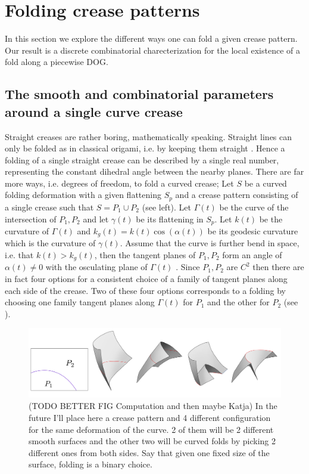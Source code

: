 \section{Folding crease patterns} \label{sec:folding}
In this section we explore the different ways one can fold a given crease pattern. Our result is a discrete combinatorial charecterization for the local existence of a fold along a piecewise DOG.

\subsection{The smooth and combinatorial parameters around a single curve crease}
Straight creases are rather boring, mathematically speaking. Straight lines can only be folded as in classical origami, i.e. by keeping them straight \cite{demaine_lens}. Hence a folding of a single straight crease can be described by a single real number, representing the constant dihedral angle between the nearby planes. There are far more ways, i.e. degrees of freedom, to fold a curved crease; Let $S$ be a curved folding deformation with a given flattening $S_p$ and a crease pattern consisting of a single crease such that $S = P_1 \cup P_2$ (see  left). Let $\Gamma(t)$ be the curve of the intersection of $P_1,P_2$ and let $\gamma(t)$ be its flattening in $S_p$. Let $k(t)$ be the curvature of $\Gamma(t)$ and $k_g(t) = k(t) \cos(\alpha(t))$ be its geodesic curvature which is the curvature of $\gamma(t)$. Assume that the curve is further bend in space, i.e. that $k(t) > k_g(t)$, then the tangent planes of $P_1,P_2$ form an angle of $\alpha(t) \neq 0$ with the osculating plane of $\Gamma(t)$ \cite{more_on_paper,duncan_folded}. Since $P_1,P_2$ are $C^2$ then there are in fact four options for a consistent choice of a family of tangent planes along each side of the crease. Two of these four options corresponds to a folding by choosing one family tangent planes along $\Gamma(t)$ for $P_1$ and the other for $P_2$ (see ).
\begin{figure} [h]
	\centering
	\includegraphics[width=\linewidth]{figures/curved_fold_through_curve.pdf}
	\caption{(TODO BETTER FIG Computation and then maybe Katja) In the future I'll place here a crease pattern and 4 different configuration for the same deformation of the curve. 2 of them will be 2 different smooth surfaces and the other two will be curved folds by picking 2 different ones from both sides. Say that given one fixed size of the surface, folding is a binary choice.}
	\label{fig:folding_combinatorics}
\end{figure}
